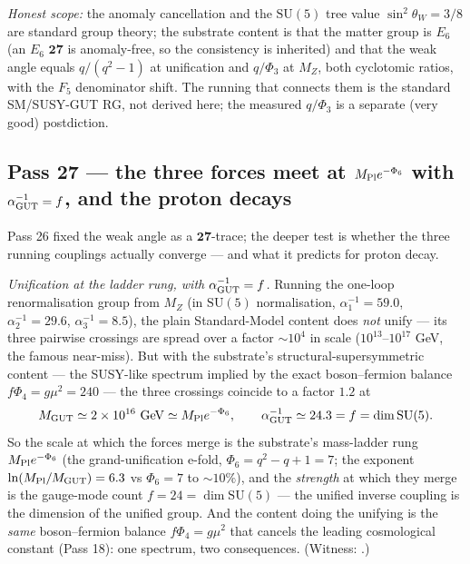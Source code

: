 \documentclass[11pt]{article}
\begin{document}
\emph{Honest scope:} the anomaly cancellation and the $\mathrm{SU}(5)$ tree value $\sin^2\theta_W=
3/8$ are standard group theory; the substrate content is that the matter group is $E_6$ (an
$E_6$ $\mathbf{27}$ is anomaly-free, so the consistency is inherited) and that the weak angle equals
$q/(q^2-1)$ at unification and $q/\Phi_3$ at $M_Z$, both cyclotomic ratios, with the $F_5$
denominator shift. The running that connects them is the standard SM/SUSY-GUT RG, not derived here;
the measured $q/\Phi_3$ is a separate (very good) postdiction.

\subsection{Pass 27 --- the three forces meet at $M_{\rm Pl}e^{-\Phi_6}$ with $\alpha_{\rm GUT}^{-1}=f$, and the proton decays}
\label{sec:capstone-twentyseven}

Pass 26 fixed the weak angle as a $\mathbf{27}$-trace; the deeper test is whether the three running
couplings actually converge --- and what it predicts for proton decay.

\emph{Unification at the ladder rung, with $\alpha_{\rm GUT}^{-1}=f$.} Running the one-loop
renormalisation group from $M_Z$ (in $\mathrm{SU}(5)$ normalisation, $\alpha_1^{-1}=59.0$,
$\alpha_2^{-1}=29.6$, $\alpha_3^{-1}=8.5$), the plain Standard-Model content does \emph{not} unify
--- its three pairwise crossings are spread over a factor $\sim10^4$ in scale ($10^{13}$--$10^{17}$
GeV, the famous near-miss). But with the substrate's structural-supersymmetric content --- the
SUSY-like spectrum implied by the exact boson--fermion balance $f\Phi_4=g\mu^2=240$ --- the three
crossings coincide to a factor $1.2$ at
\[
M_{\rm GUT}\simeq2\times10^{16}\ \mathrm{GeV}\simeq M_{\rm Pl}e^{-\Phi_6},\qquad
\alpha_{\rm GUT}^{-1}\simeq24.3=f=\dim\mathrm{SU}(5).
\]
So the scale at which the forces merge is the substrate's mass-ladder rung $M_{\rm Pl}e^{-\Phi_6}$
(the grand-unification e-fold, $\Phi_6=q^2{-}q{+}1=7$; the exponent $\ln(M_{\rm Pl}/M_{\rm GUT})=6.3$
vs $\Phi_6=7$ to $\sim10\%$), and the \emph{strength} at which they merge is the gauge-mode count
$f=24=\dim\mathrm{SU}(5)$ --- the unified inverse coupling is the dimension of the unified group. And
the content doing the unifying is the \emph{same} boson--fermion balance $f\Phi_4=g\mu^2$ that
cancels the leading cosmological constant (Pass 18): one spectrum, two consequences. (Witness:
.)
\end{document}
